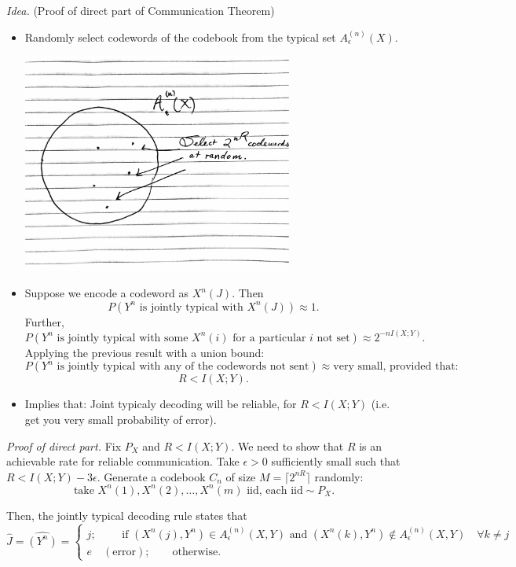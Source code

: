 \documentclass[13pt]{article}
\newcommand{\eps}{\epsilon}
\newcommand{\T}{\text}
\begin{document}
{\it Idea.} (Proof of direct part of Communication Theorem)

\begin{itemize}
  \item Randomly select codewords of the codebook from the typical set $A_{\eps}^{(n)}(X)$.


    \includegraphics[width=0.7\textwidth]{img/random-cw.pdf}

  \item Suppose we encode a codeword as $X^n(J)$.  Then
    \[
      P(\T{$Y^n$ is jointly typical with $X^n(J)$} ) \approx 1.
    \]
    Further,
    \[
      P(\T{$Y^n$ is jointly typical with some $X^n(i)$ for a particular $i$ not set}) \approx 2^{-n I(X; Y)}.
    \]
    Applying the previous result with a union bound:
    \[
      P(\T{$Y^n$ is jointly typical with any of the codewords not sent}) \approx \text{very small, provided that:}
    \]
    \[
      R < I(X; Y).
    \]
  \item Implies that: Joint typicaly decoding will be reliable, for $R < I(X; Y)$ (i.e. get you very small probability of error).
\end{itemize}

{\it Proof of direct part.}  Fix $P_X$ and $R < I(X; Y)$.  We need to show that $R$ is an achievable rate for reliable communication.  Take $\eps > 0$ sufficiently small such that $R < I(X; Y) - 3 \epsilon$.  Generate a codebook $C_n$ of size $M = \lceil2^{nR} \rceil$ randomly:
\[
  \T{take } X^n(1), X^n(2), \dots, X^n(m) \T{ iid, each iid} \sim P_X.
\]

Then, the jointly typical decoding rule states that
\[
  \hat{J} = \hat{(Y^n)} =
  \begin{cases}
    j; \qquad \text{ if } (X^n(j), Y^n) \in A_{\eps}^{(n)} (X, Y) \text{ and } (X^{n}(k), Y^{n}) \not \in A_{\eps}^{(n)}(X, Y) \quad \forall k \neq j \\
    e \quad (\text{error}); \qquad \T{otherwise}.
    \end{cases}
\]
\end{document}
